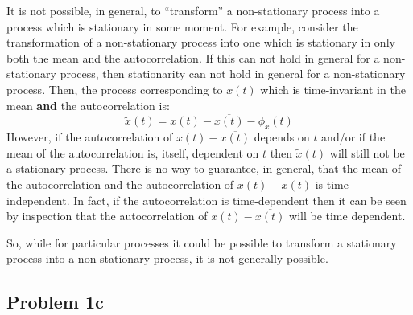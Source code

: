 \begin{homeworkProblem}
   It is not possible, in general, to ``transform'' a non-stationary process
   into a process which is stationary in some moment. For example, consider the
   transformation of a non-stationary process into one which is stationary in
   only both the mean and the autocorrelation. If this can not hold in general
   for a non-stationary process, then stationarity can not hold in general for a
   non-stationary process. Then, the process corresponding to $ x(t) $ which is
   time-invariant in the mean \textbf{and} the autocorrelation is:
   \[
      \tilde{x}(t) = x(t) - \overline{x(t)} - \phi_{x}(t)
   \]
However, if the autocorrelation of $ x(t) - \overline{x(t)} $ depends
   on $ t $ and/or if the mean of the autocorrelation is, itself, dependent on $
   t $ then $ \tilde{x}(t) $ will still not be a stationary process. There is no
   way to guarantee, in general, that the mean of the autocorrelation and the
   autocorrelation of $ x(t) - \overline{x(t)} $ is time independent. In
   fact, if the autocorrelation is time-dependent then it can be seen by
   inspection that the autocorrelation of $ x(t) - \overline{x(t)} $ will
   be time dependent.

   So, while for particular processes it could be possible to transform a
   stationary process into a non-stationary process, it is not generally
   possible.

   \subsection{Problem 1c}


\end{homeworkProblem}

